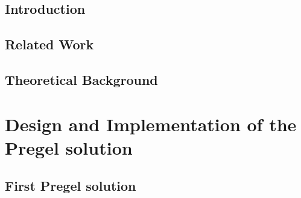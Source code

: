 \documentclass{legrand}
\begin{document}







\setcounter{page}{0}



\tableofcontents

\listoffigures

\listoftables


\chapter{Introduction}
\setcounter{page}{0} %
\label{chapter:intro}


\chapter{Related Work}
\label{chapter:related}


\chapter{Theoretical Background}
\label{chapter:theory}


\part{Design and Implementation of the Pregel solution}

\chapter{First Pregel solution}
\label{chapter:first}

\end{document}
